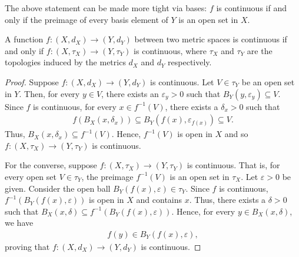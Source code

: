 The above statement can be made more tight via bases: $f$ is continuous if and only if the preimage of every basis element of $Y$ is an open set in $X$.

\begin{lemma}
    A function $f: (X,d_{X}) \to (Y,d_{Y})$ between two metric spaces is continuous if and only if $f:(X,\tau_{X}) \to (Y,\tau_{Y})$ is continuous, where $\tau_{X}$ and $\tau_{Y}$ are the topologies induced by the metrics $d_{X}$ and $d_{Y}$ respectively.
\end{lemma}

\begin{proof}
    Suppose $f: (X,d_{X}) \to (Y,d_{Y})$ is continuous. Let $V \in \tau_{Y}$ be an open set in $Y$. Then, for every $y \in V$, there exists an $\varepsilon_{y} > 0$ such that $B_{Y}(y,\varepsilon_{y}) \subseteq V$. Since $f$ is continuous, for every $x \in f^{-1}(V)$, there exists a $\delta_{x} > 0$ such that
    \begin{align}
        f(B_{X}(x,\delta_{x})) \subseteq B_{Y}(f(x),\varepsilon_{f(x)}) \subseteq V.
    \end{align}
    Thus, $B_{X}(x,\delta_{x}) \subseteq f^{-1}(V)$. Hence, $f^{-1}(V)$ is open in $X$ and so $f:(X,\tau_{X}) \to (Y,\tau_{Y})$ is continuous.

    For the converse, suppose $f:(X,\tau_{X}) \to (Y,\tau_{Y})$ is continuous. That is, for every open set $V \in \tau_{Y}$, the preimage $f^{-1}(V)$ is an open set in $\tau_{X}$. Let $\varepsilon > 0$ be given. Consider the open ball $B_{Y}(f(x),\varepsilon) \in \tau_{Y}$. Since $f$ is continuous, $f^{-1}(B_{Y}(f(x),\varepsilon))$ is open in $X$ and contains $x$. Thus, there exists a $\delta > 0$ such that $B_{X}(x,\delta) \subseteq f^{-1}(B_{Y}(f(x),\varepsilon))$. Hence, for every $y \in B_{X}(x,\delta)$, we have
    \begin{align}
        f(y) \in B_{Y}(f(x),\varepsilon),
    \end{align}
    proving that $f: (X,d_{X}) \to (Y,d_{Y})$ is continuous.
\end{proof}



